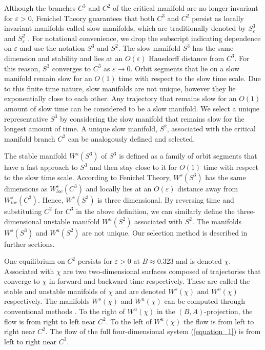 \documentclass{ws-ijbc}
\begin{document}
Although the branches $C^3$ and $C^2$ of the critical manifold are no longer invariant for $\varepsilon > 0$, Fenichel Theory guarantees that both $C^3$ and $C^2$ persist as locally invariant manifolds called slow manifolds, which are traditionally denoted by $S^3_\varepsilon$ and $S^2_\varepsilon$ \cite{Fenichel}.  For notational convenience, we drop the subscript indicating dependence on $\varepsilon$ and use the notation $S^3$ and $S^2$.  The slow manifold $S^3$ has the same dimension and stability and lies at an $O(\varepsilon)$ Hausdorff distance from $C^3$.  For this reason, $S^3$ converges to $C^3$ as $\varepsilon \rightarrow 0$.  Orbit segments that lie on a slow manifold remain slow for an $O(1)$ time with respect to the slow time scale.  Due to this finite time nature, slow manifolds are not unique, however they lie exponentially close to each other.  Any trajectory that remains slow for an $O(1)$ amount of slow time can be considered to be a slow manifold.  We select a unique representative $S^3$ by considering the slow manifold that remains slow for the longest amount of time.  A unique slow manifold, $S^2$, associated with the critical manifold branch $C^2$ can be analogously defined and selected.
    
The stable manifold $W^s(S^3)$ of $S^3$ is defined as a family of orbit segments that have a fast approach to $S^3$ and then stay close to it for $O(1)$ time with respect to the slow time scale.  According to Fenichel Theory, $W^{s}(S^3)$ has the same dimensions as $W^{s}_{loc}(C^3)$ and locally lies at an $O(\varepsilon)$ distance away from $W^{s}_{loc}(C^3)$.  Hence, $W^s(S^3)$ is three dimensional.  By reversing time and substituting $C^2$ for $C^3$ in the above definition, we can similarly define the three-dimensional unstable manifold $W^{u}(S^2)$ associated with $S^2$.  The manifolds $W^{s}(S^3)$ and $W^{u}(S^2)$ are not unique.  Our selection method is described in further sections.
 
One equilibrium on $C^2$ persists for $\varepsilon >0$ at $B \approx 0.323$ and is denoted $\chi$.  Associated with $\chi$ are two two-dimensional surfaces composed of trajectories that converge to $\chi$ in forward and backward time respectively.  These are called the stable and unstable manifolds of $\chi$ and are denoted $W^s(\chi)$ and $W^u(\chi)$ respectively.  The manifolds $W^s(\chi)$ and $W^u(\chi)$ can be computed through conventional methods \cite{Red_book}.  To the right of $W^u(\chi)$ in the $(B,A)$-projection, the flow is from right to left near $C^2$.  To the left of $W^u(\chi)$ the flow is from left to right near $C^2$.  The flow of the full four-dimensional system (\ref{equation_1}) is from left to right near $C^3$.
 
\end{document}
